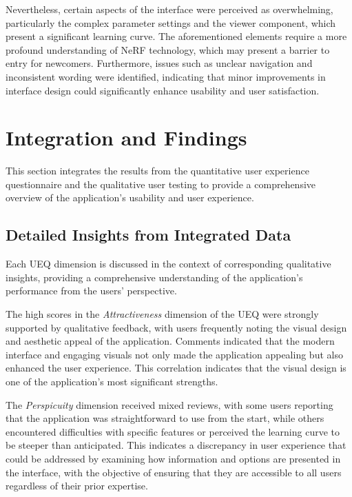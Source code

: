 Nevertheless, certain aspects of the interface were perceived as overwhelming, particularly the complex parameter settings and the viewer component, which present a significant learning curve.
The aforementioned elements require a more profound understanding of NeRF technology, which may present a barrier to entry for newcomers.
Furthermore, issues such as unclear navigation and inconsistent wording were identified, indicating that minor improvements in interface design could significantly enhance usability and user satisfaction.

\section{Integration and Findings}
\label{sec:result:findings}

This section integrates the results from the quantitative user experience questionnaire and the qualitative user testing to provide a comprehensive overview of the application's usability and user experience.

\subsection*{Detailed Insights from Integrated Data}
\label{subsec:findings:detailed_insights}
Each UEQ dimension is discussed in the context of corresponding qualitative insights, providing a comprehensive understanding of the application’s performance from the users' perspective.

The high scores in the \emph{Attractiveness} dimension of the UEQ were strongly supported by qualitative feedback, with users frequently noting the visual design and aesthetic appeal of the application. 
Comments indicated that the modern interface and engaging visuals not only made the application appealing but also enhanced the user experience. 
This correlation indicates that the visual design is one of the application's most significant strengths.

The \emph{Perspicuity} dimension received mixed reviews, with some users reporting that the application was straightforward to use from the start, while others encountered difficulties with specific features or perceived the learning curve to be steeper than anticipated. 
This indicates a discrepancy in user experience that could be addressed by examining how information and options are presented in the interface, with the objective of ensuring that they are accessible to all users regardless of their prior expertise.

